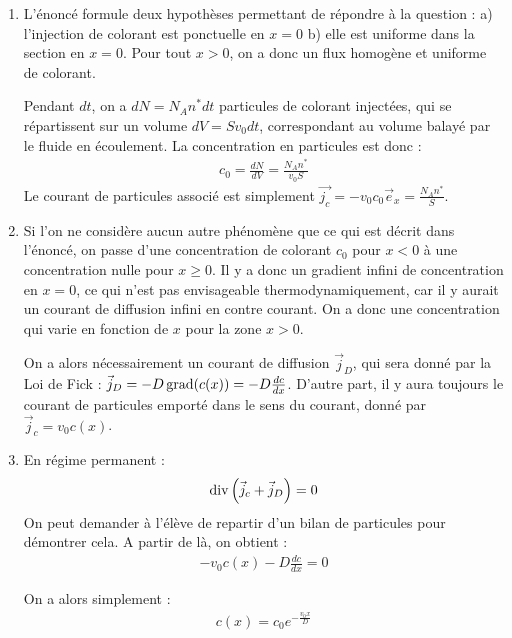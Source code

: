 \begin{correction}

\begin{enumerate}

\item L'énoncé formule deux hypothèses permettant de répondre à la question : a) l'injection de colorant est ponctuelle en $x=0$ b) elle est uniforme dans la section en $x=0$. Pour tout $x>0$, on a donc un flux homogène et uniforme de colorant.

Pendant $dt$, on a $dN=N_An^*dt$ particules de colorant injectées, qui se répartissent sur un volume $dV=Sv_0dt$, correspondant au volume balayé par le fluide en écoulement. La concentration en particules est donc :
\begin{align*}
c_0=\frac{dN}{dV}=\frac{N_A n^*}{v_0S}
\end{align*}
Le courant de particules associé est simplement $\vec{j_c}=-v_0c_0\vec{e}_x=\frac{N_A n^*}{S}$.

\item Si l'on ne considère aucun autre phénomène que ce qui est décrit dans l'énoncé, on passe d'une concentration de colorant $c_0$ pour $x<0$ à une concentration nulle pour $x\geq0$. Il y a donc un gradient infini de concentration en $x=0$, ce qui n'est pas envisageable thermodynamiquement, car il y aurait un courant de diffusion infini en contre courant. On a donc une concentration qui varie en fonction de $x$ pour la zone $x>0$.

On a alors nécessairement un courant de diffusion $\vec{j}_D$, qui sera donné par la Loi de Fick : $\vec{j}_D=-D\mathop{}\!\mathrm{grad}(c(x))=-D\frac{dc}{dx}$. D'autre part, il y aura toujours le courant de particules emporté dans le sens du courant, donné par $\vec{j}_c=v_0c(x)$.

\item En régime permanent :
\begin{align*}
	\mathop{}\!\mathrm{div} \left(\vec{j}_c+ \vec{j}_D\right)  =0
\end{align*}
On peut demander à l'élève de repartir d'un bilan de particules pour démontrer cela. A partir de là, on obtient :
\begin{align*}
	-v_0c(x)-D\frac{dc}{dx} =0
\end{align*}

On a alors simplement :
\begin{align*}
	c(x)=c_0e^{-\frac{v_0x}{D}}
\end{align*}

\end{enumerate}

\end{correction}

